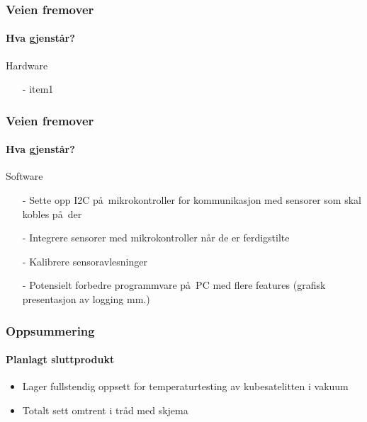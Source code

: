 \documentclass{beamer}
\begin{document}
    \begin{frame}
    	\frametitle{Veien fremover}
    	\framesubtitle{Hva gjenst\aa r?}
    	\begin{block}{Hardware}
    		\begin{itemize}
    			\item[-] item1
    		\end{itemize}
    	\end{block}
    \end{frame}
    
    \begin{frame}
    \frametitle{Veien fremover}
    \framesubtitle{Hva gjenst\aa r?}
    \begin{block}{Software}
    	\begin{itemize}
    	\item[-] Sette opp I2C p\aa\ mikrokontroller for kommunikasjon med sensorer som skal kobles p\aa\ der
    	\item[-] Integrere sensorer med mikrokontroller n\aa r de er ferdigstilte
    	\item[-] Kalibrere sensoravlesninger
    	\item[-] Potensielt forbedre programmvare p\aa\ PC med flere features (grafisk presentasjon av logging mm.)
    	\end{itemize}
    \end{block}
  \end{frame}
  \begin{frame}
    \frametitle{Oppsummering}
    \framesubtitle{Planlagt sluttprodukt}
    \begin{itemize}
    	\item Lager fullstendig oppsett for temperaturtesting av kubesatelitten i vakuum
    	\item Totalt sett omtrent i tr\aa d med skjema
    \end{itemize}
  \end{frame}
\end{document}

